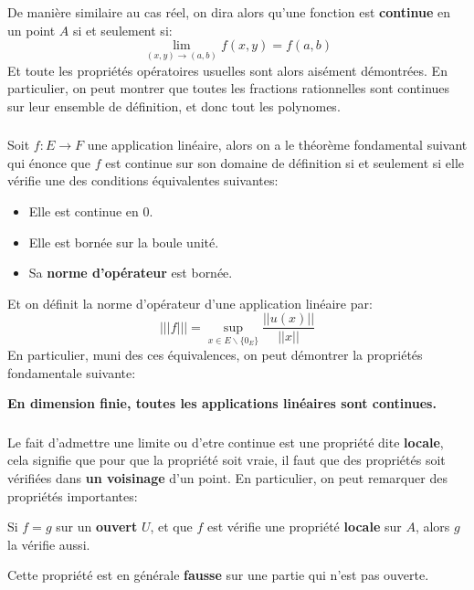 \chapter*{}
De manière similaire au cas réel, on dira alors qu'une fonction est \textbf{continue} en un point \(A\) si et seulement si:
\[
   \lim_{(x, y) \rightarrow (a, b)} f(x, y) = f(a, b)   
\]
Et toute les propriétés opératoires usuelles sont alors aisément démontrées. En particulier, on peut montrer que toutes les fractions rationnelles sont continues sur leur ensemble de définition, et donc tout les polynomes.

\subsection*{}
Soit \(f : E \rightarrow F\) une application linéaire, alors on a le théorème fondamental suivant qui énonce que \(f\) est continue sur son domaine de définition si et seulement si elle vérifie une des conditions équivalentes suivantes:
\begin{itemize}
   \item Elle est continue en 0.
   \item Elle est bornée sur la boule unité.
   \item Sa \textbf{norme d'opérateur} est bornée.
\end{itemize}
Et on définit la norme d'opérateur d'une application linéaire par:
\[
   |||f||| = \underset{x \in E \backslash \{0_E\}}{\sup}{\frac{||u(x)||}{||x||}}   
\]
En particulier, muni des ces équivalences, on peut démontrer la propriétés fondamentale suivante:
\begin{center}
   \textbf{En dimension finie, toutes les applications linéaires sont continues.}
\end{center}

\subsection*{}
Le fait d'admettre une limite ou d'etre continue est une propriété dite \textbf{locale}, cela signifie que pour que la propriété soit vraie, il faut que des propriétés soit vérifiées dans \textbf{un voisinage} d'un point. En particulier, on peut remarquer des propriétés importantes:
\begin{center}
   Si \(f = g\) sur un \textbf{ouvert} \(U\), et que \(f\) est vérifie une propriété \textbf{locale} sur \(A\), alors \(g\) la vérifie aussi.
\end{center}
Cette propriété est en générale \textbf{fausse} sur une partie qui n'est pas ouverte.

